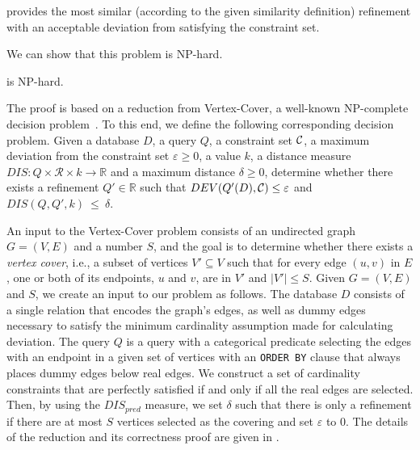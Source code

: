 \problem{} provides the most similar (according to the given similarity definition) refinement with an acceptable deviation from satisfying the constraint set.

We can show that this problem is {\sf NP-hard}.

\begin{theorem}
\label{thm:hardness}
    \problem{} is {\sf NP-hard}.
\end{theorem}

The proof is based on a reduction from {\sc Vertex-Cover}, a well-known {\sf NP-complete} decision problem~\cite{K72}. To this end, we define the following corresponding decision problem. Given a database $D$, a query $Q$, a constraint set $\mathcal{C}$, a maximum deviation from the constraint set $\varepsilon \geq 0$, a value $k$, a distance measure $DIS : Q \times \mathcal{R} \times k \rightarrow \mathbb{R}$ and a maximum distance $\delta \geq 0$, determine whether there exists a refinement $Q'\in \mathbb{R}$ such that $DEV(Q'(D), \mathcal{C}) \leq \varepsilon$ and $DIS(Q, Q', k)~\leq~\delta$. 

An input to the {\sc Vertex-Cover} problem consists of an undirected graph $G = (V, E)$ and a number $S$, and the goal is to determine whether there exists a {\it vertex cover}, i.e., a subset of vertices $V' \subseteq V$ such that for every edge $(u, v)$ in $E$, one or both of its endpoints, $u$ and $v$, are in $V'$ and $|V'| \leq S$. 
Given $G = (V, E)$ and $S$, we create an input to our problem as follows. The database $D$ consists of a single relation that encodes the graph's edges, as well as dummy edges necessary to satisfy the minimum cardinality assumption made for calculating deviation. The query $Q$ is a query with a categorical predicate selecting the edges with an endpoint in a given set of vertices with an {\tt ORDER BY} clause that always places dummy edges below real edges. We construct a set of cardinality constraints that are perfectly satisfied if and only if all the real edges are selected. Then, by using the $DIS_{pred}$ measure, we set $\delta$ such that there is only a refinement if there are at most $S$ vertices selected as the covering and set $\varepsilon$ to $0$. The details of the reduction and its correctness proof are given in \cite{Extended}.